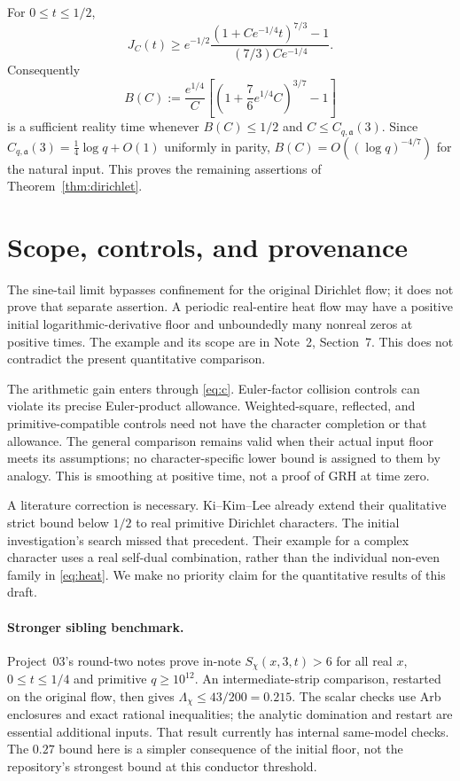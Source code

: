 \documentclass[11pt]{article}
\theoremstyle{remark}\newtheorem{remark}[theorem]{Remark}
\begin{document}
For $0\le t\le1/2$,
\[J_C(t)\ge e^{-1/2}
\frac{(1+Ce^{-1/4}t)^{7/3}-1}{(7/3)Ce^{-1/4}}.\]
Consequently
\begin{equation}
 B(C):=\frac{e^{1/4}}C
 \left[\left(1+\frac76e^{1/4}C\right)^{3/7}-1\right]
 \label{eq:bc}
\end{equation}
is a sufficient reality time whenever $B(C)\le1/2$ and
$C\le C_{q,\mathfrak a}(3)$. Since
$C_{q,\mathfrak a}(3)=\frac14\log q+O(1)$ uniformly in parity,
$B(C)=O((\log q)^{-4/7})$ for the natural input. This proves the
remaining assertions of Theorem~\ref{thm:dirichlet}.

\section{Scope, controls, and provenance}
The sine-tail limit bypasses confinement for the original Dirichlet
flow; it does not prove that separate assertion. A periodic real-entire
heat flow may have a positive initial logarithmic-derivative floor and
unboundedly many nonreal zeros at positive times. The example and its
scope are in Note~2, Section~7. This does not contradict the present
quantitative comparison.

The arithmetic gain enters through \eqref{eq:c}. Euler-factor collision
controls can violate its precise Euler-product allowance. Weighted-square,
reflected, and primitive-compatible controls need not have the character
completion or that allowance. The general comparison remains valid when
their actual input floor meets its assumptions; no character-specific
lower bound is assigned to them by analogy. This is smoothing at
positive time, not a proof of GRH at time zero.

A literature correction is necessary. Ki--Kim--Lee
\cite[Section~6, Example~1]{kkl} already extend their qualitative
strict bound below $1/2$ to real primitive Dirichlet characters. The
initial investigation's search missed that precedent. Their example
for a complex character uses a real self-dual combination, rather than
the individual non-even family in \eqref{eq:heat}. We make no priority
claim for the quantitative results of this draft.

\paragraph{Stronger sibling benchmark.}
Project~03's round-two notes \cite{p03floor,p03restart} prove in-note
$S_\chi(x,3,t)>6$ for all real $x$, $0\le t\le1/4$ and primitive
$q\ge10^{12}$. An intermediate-strip comparison, restarted on the
original flow, then gives $\Lambda_\chi\le43/200=0.215$.
The scalar checks use Arb enclosures and exact rational inequalities;
the analytic domination and restart are essential additional inputs.
That result currently has internal same-model checks. The $0.27$ bound
here is a simpler consequence of the initial floor, not the repository's
strongest bound at this conductor threshold.
\end{document}
